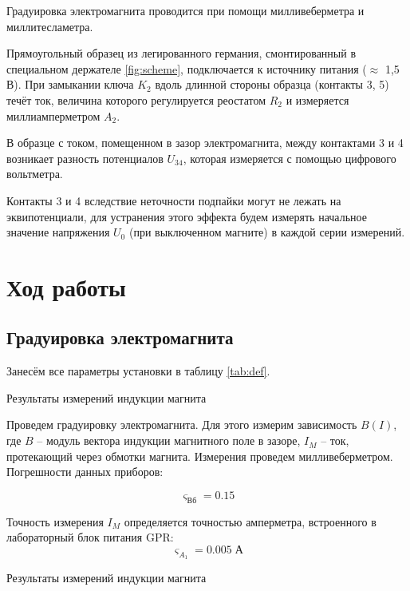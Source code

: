 \documentclass[12pt,a4paper]{article}
\begin{document}
Градуировка электромагнита проводится при помощи милливеберметра и миллитесламетра.

Прямоугольный образец из легированного германия, смонтированный в специальном держателе \ref{fig:scheme}, подключается к источнику питания ($\approx$ 1,5 В). При замыкании ключа $K_2$ вдоль длинной стороны образца (контакты 3, 5) течёт ток, величина которого регулируется реостатом $R_2$ и измеряется миллиамперметром $A_2$.

В образце с током, помещенном в зазор электромагнита, между контактами 3 и 4 возникает разность потенциалов $U_{34}$, которая измеряется с помощью цифрового вольтметра.

Контакты 3 и 4 вследствие неточности подпайки могут не лежать на эквипотенциали, для устранения этого эффекта будем измерять начальное значение напряжения $U_0$ (при выключенном магните) в каждой серии измерений.




\section*{Ход работы}
	
	\subsection*{Градуировка электромагнита}
	
	Занесём все параметры установки в таблицу \ref{tab:def}.
	
	\begin{table}[H]
	    \caption{Результаты измерений индукции магнита}
		
		\label{tab:def}
	\end{table}
	
	Проведем градуировку электромагнита. Для этого измерим зависимость $B(I)$, где $B$ -- модуль вектора индукции магнитного поле в зазоре, $I_M$ -- ток, протекающий через обмотки магнита. Измерения проведем милливеберметром. Погрешности данных приборов:
	
	$$ \varsigma_{\text{Вб}} = 0.15$$
	
	Точность измерения $I_M$ определяется точностью амперметра, встроенного в лабораторный блок питания GPR: $$\varsigma_{A_1} = 0.005 \; \text{А}$$
	
	\begin{table}[H]
		
		\caption{Результаты измерений индукции магнита}
		\label{tab:ind}
	\end{table}
\end{document}
